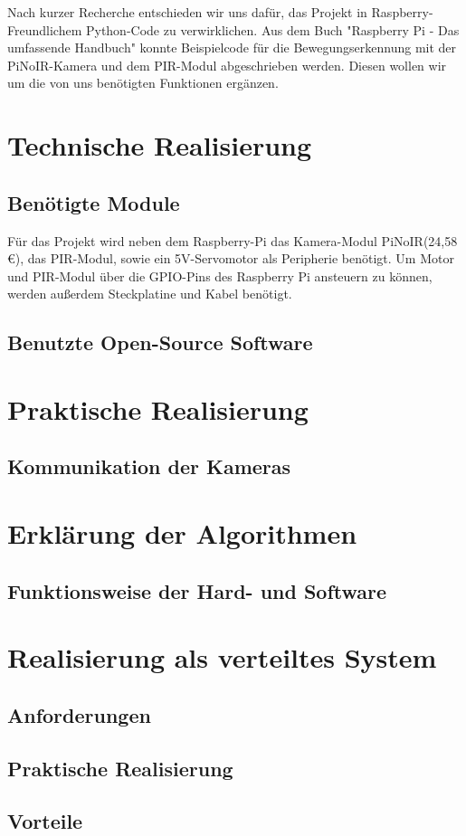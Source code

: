 \documentclass[12pt,a4paper]{scrreprt}
\begin{document}
Nach kurzer Recherche entschieden wir uns dafür, das Projekt in Raspberry-Freundlichem Python-Code zu verwirklichen.
Aus dem Buch "Raspberry Pi - Das umfassende Handbuch" konnte Beispielcode für die Bewegungserkennung mit der PiNoIR-Kamera und dem PIR-Modul abgeschrieben werden.
Diesen wollen wir um die von uns benötigten Funktionen ergänzen.

\chapter{Technische Realisierung}
\section{Benötigte Module}
Für das Projekt wird neben dem Raspberry-Pi das Kamera-Modul PiNoIR(24,58 €), das PIR-Modul, sowie ein 5V-Servomotor als Peripherie benötigt. Um Motor und PIR-Modul über die GPIO-Pins des Raspberry Pi ansteuern zu können, werden außerdem Steckplatine und Kabel benötigt.




\section{Benutzte Open-Source Software}

\chapter{Praktische Realisierung}
\section{Kommunikation der Kameras}


\chapter{Erklärung der Algorithmen}
\section{Funktionsweise der Hard- und Software}

\chapter{Realisierung als verteiltes System}
\section{Anforderungen}

\section{Praktische Realisierung}

\section{Vorteile}
\end{document}
